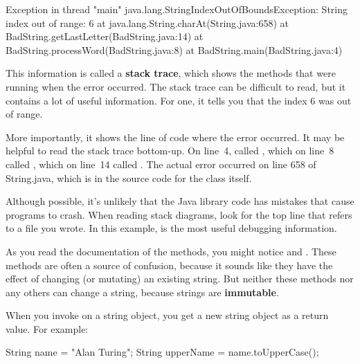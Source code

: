 \begin{small}
\begin{stdout}
Exception in thread "main" java.lang.StringIndexOutOfBoundsException:
String index out of range: 6
    at java.lang.String.charAt(String.java:658)
    at BadString.getLastLetter(BadString.java:14)
    at BadString.processWord(BadString.java:8)
    at BadString.main(BadString.java:4)
\end{stdout}
\end{small}



This information is called a {\bf stack trace}, which shows the methods that were running when the error occurred.
The stack trace can be difficult to read, but it contains a lot of useful information.
For one, it tells you that the index 6 was out of range.

More importantly, it shows the line of code where the error occurred.
It may be helpful to read the stack trace bottom-up.
On line~4,  called , which on line~8 called , which on line~14 called .
The actual error occurred on line 658 of String.java, which is in the source code for the  class itself.

Although possible, it's unlikely that the Java library code has mistakes that cause programs to crash.
When reading stack diagrams, look for the top line that refers to a file you wrote.
In this example,  is the most useful debugging information.

\label{immutable}


As you read the documentation of the  methods, you might notice  and .
These methods are often a source of confusion, because it sounds like they have the effect of changing (or mutating) an existing string.
But neither these methods nor any others can change a string, because strings are {\bf immutable}.

When you invoke  on a string object, you get a new string object as a return value.
For example:

\begin{code}
String name = "Alan Turing";
String upperName = name.toUpperCase();
\end{code}

